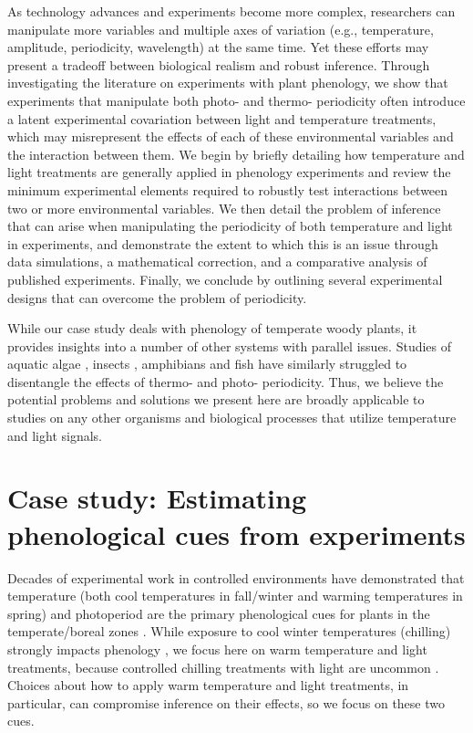 \documentclass[11pt]{article}
\begin{document}
As technology advances and experiments become more complex, researchers can manipulate more variables and multiple axes of variation (e.g., temperature, amplitude, periodicity, wavelength) at the same time. Yet these efforts may present a tradeoff between biological realism and robust inference. Through investigating the literature on experiments with plant phenology, we show that experiments that manipulate both photo- and thermo- periodicity often introduce a latent experimental covariation between light and temperature treatments, which may misrepresent the effects of each of these environmental variables and the interaction between them. We begin by briefly detailing how temperature and light treatments are generally applied in phenology experiments and review the minimum experimental elements required to robustly test interactions between two or more environmental variables. We then detail the problem of inference that can arise when manipulating the periodicity of both temperature and light in experiments, and demonstrate the extent to which this is an issue through data simulations, a mathematical correction, and a comparative analysis of published experiments. Finally, we conclude by outlining several experimental designs that can overcome the problem of periodicity. 

While our case study deals with phenology of temperate woody plants, it provides insights into a number of other systems with parallel issues. Studies of aquatic algae \citep{XU2019167}, insects \citep{ANDUAGA201846}, amphibians \citep{WRIGHT200433} and fish \citep{Olemda_2009} have similarly struggled to disentangle the effects of thermo- and photo- periodicity.  Thus, we believe the potential problems and solutions we present here are broadly applicable to studies on any other organisms and biological processes that utilize temperature and light signals. 

\section*{Case study: Estimating phenological cues from experiments}
Decades of experimental work in controlled environments have demonstrated that temperature (both cool temperatures in fall/winter and warming temperatures in spring) and photoperiod are the primary phenological cues for plants in the temperate/boreal zones \citep{Ettinger:2020aa}. While exposure to cool winter temperatures (chilling) strongly impacts phenology \citep{Laube2014}, we focus here on warm temperature and light treatments, because controlled chilling treatments with light are uncommon \citep{Wolkovich_2022}. Choices about how to apply warm temperature and light treatments, in particular, can compromise inference on their effects, so we focus on these two cues.
\end{document}
